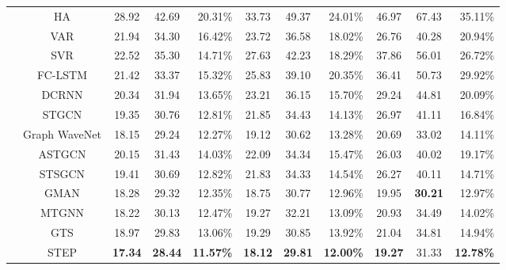 \documentclass[sigconf]{acmart}
\begin{document}
\begin{table*}[htpb]
\begin{tabular}{ccccr|ccr|ccr}
    \midrule  
    \midrule
    \color{black}{\multirow{14}*{\textbf{PEMS04}}}
      &HA              & 28.92  & 42.69  & 20.31\%        & 33.73  & 49.37  & 24.01\%       & 46.97  & 67.43  & 35.11\% \\ 
      &VAR             & 21.94  & 34.30  & 16.42\%        & 23.72  & 36.58  & 18.02\%        & 26.76  & 40.28  & 20.94\% \\ 
      &SVR             & 22.52  & 35.30  & 14.71\%        & 27.63  & 42.23  & 18.29\%       & 37.86  & 56.01  & 26.72\% \\ 
      &FC-LSTM         & 21.42  & 33.37  & 15.32\%        & 25.83  & 39.10  & 20.35\%       & 36.41  & 50.73  & 29.92\% \\ 
      &DCRNN           & 20.34  & 31.94  & 13.65\%        & 23.21  & 36.15  & 15.70\%       & 29.24  & 44.81  & 20.09\% \\ 
      &STGCN           & 19.35  & 30.76  & 12.81\%        & 21.85  & 34.43  & 14.13\%       & 26.97  & 41.11  & 16.84\% \\ 
      &Graph WaveNet   & 18.15  & 29.24  & 12.27\%        & 19.12  & 30.62  & 13.28\%       & 20.69  & 33.02  & 14.11\% \\
      &ASTGCN          & 20.15  & 31.43  & 14.03\%        & 22.09  & 34.34  & 15.47\%       & 26.03  & 40.02  & 19.17\% \\  
      &STSGCN          & 19.41  & 30.69  & 12.82\%        & 21.83  & 34.33  & 14.54\%       & 26.27  & 40.11  & 14.71\% \\  
      &GMAN            & 18.28  & 29.32  & 12.35\%        & 18.75  & 30.77  & 12.96\%       & 19.95  & \textbf{30.21}  & 12.97\% \\  
      &MTGNN           & 18.22  & 30.13  & 12.47\%        & 19.27  & 32.21  & 13.09\%       & 20.93  & 34.49  & 14.02\% \\  
      &GTS            & 18.97  & 29.83  & 13.06\%        & 19.29  & 30.85  & 13.92\%       & 21.04  & 34.81  & 14.94\% \\  
    \cmidrule(r){2-11}
      &STEP      & \textbf{17.34}  & \textbf{28.44}  & \textbf{11.57\%}        & \textbf{18.12}  & \textbf{29.81}  & \textbf{12.00\%}      & \textbf{19.27}  & 31.33  & \textbf{12.78\%} \\ 
        \midrule
      \bottomrule
    \end{tabular}
  \end{table*} 
\end{document}
